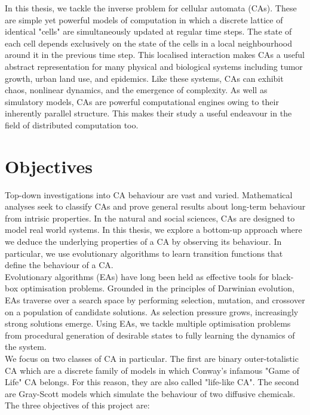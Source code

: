 In this thesis, we tackle the inverse problem for cellular automata (CAs). These are simple yet powerful models of computation in which a discrete lattice of identical "cells" are simultaneously updated at regular time steps. The state of each cell depends exclusively on the state of the cells in a local neighbourhood around it in the previous time step. This localised interaction makes CAs a useful abstract representation for many physical and biological systems including tumor growth\cite{deutsch2021bio, reher2017cell}, urban land use\cite{white2000high}, and epidemics\cite{white2007modeling}. Like these systems, CAs can exhibit chaos, nonlinear dynamics, and the emergence of complexity. As well as simulatory models, CAs are powerful computational engines owing to their inherently parallel structure. This makes their study a useful endeavour in the field of distributed computation too\cite{tosic2005cellular}.\\


\section{Objectives}

Top-down investigations into CA behaviour are vast and varied. Mathematical analyses seek to classify CAs and prove general results about long-term behaviour from intrisic properties. In the natural and social sciences, CAs are designed to model real world systems. In this thesis, we explore a bottom-up approach where we deduce the underlying properties of a CA by observing its behaviour. In particular, we use evolutionary algorithms to learn transition functions that define the behaviour of a CA.\\

Evolutionary algorithms (EAs) have long been held as effective tools for black-box optimisation problems. Grounded in the principles of Darwinian evolution, EAs traverse over a search space by performing selection, mutation, and crossover on a population of candidate solutions. As selection pressure grows, increasingly strong solutions emerge. Using EAs, we tackle multiple optimisation problems from procedural generation of desirable states to fully learning the dynamics of the system.\\

We focus on two classes of CA in particular. The first are binary outer-totalistic CA which are a discrete family of models in which Conway's infamous "Game of Life" CA belongs. For this reason, they are also called "life-like CA". The second are Gray-Scott models which simulate the behaviour of two diffusive chemicals. The three objectives of this project are:

